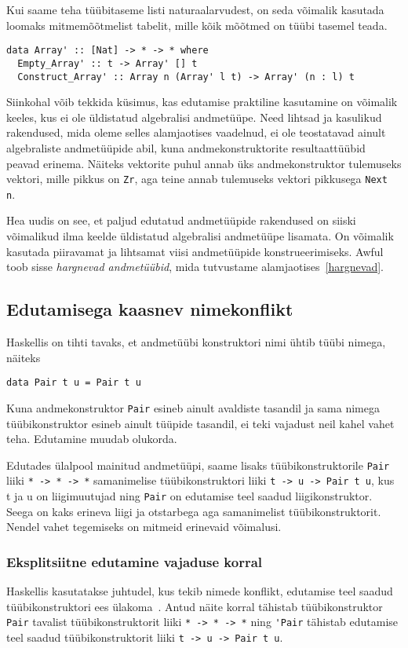 \documentclass[12pt]{article}
\begin{document}
      Kui saame teha tüübitaseme listi naturaalarvudest, on seda võimalik kasutada loomaks mitmemõõtmelist tabelit, mille kõik mõõtmed on tüübi tasemel teada.

      \begin{verbatim}data Array' :: [Nat] -> * -> * where
  Empty_Array' :: t -> Array' [] t
  Construct_Array' :: Array n (Array' l t) -> Array' (n : l) t\end{verbatim}

      Siinkohal võib tekkida küsimus, kas edutamise praktiline kasutamine on võimalik keeles, kus ei ole üldistatud algebralisi andmetüüpe. Need lihtsad ja kasulikud rakendused, mida oleme selles alamjaotises vaadelnud, ei ole teostatavad ainult algebraliste andmetüüpide abil, kuna andmekonstruktorite resultaattüübid peavad erinema. Näiteks vektorite puhul annab üks andmekonstruktor tulemuseks vektori, mille pikkus on \verb!Zr!, aga teine annab tulemuseks vektori pikkusega \verb!Next n!.

      Hea uudis on see, et paljud edutatud andmetüüpide rakendused on siiski võimalikud ilma keelde üldistatud algebralisi andmetüüpe lisamata. On võimalik kasutada piiravamat ja lihtsamat viisi andmetüüpide konstrueerimiseks. Awful toob sisse \textit{hargnevad andmetüübid}, mida tutvustame alamjaotises~\ref{hargnevad}.
    \subsection{Edutamisega kaasnev nimekonflikt}
      Haskellis on tihti tavaks, et andmetüübi konstruktori nimi ühtib tüübi nimega, näiteks

      \begin{verbatim}data Pair t u = Pair t u\end{verbatim}

      Kuna andmekonstruktor \verb!Pair! esineb ainult avaldiste tasandil ja sama nimega tüübikonstruktor esineb ainult tüüpide tasandil, ei teki vajadust neil kahel vahet teha. Edutamine muudab olukorda.

      Edutades ülalpool mainitud andmetüüpi, saame lisaks tüübikonstruktorile \verb!Pair! liiki \verb!* -> * -> *! samanimelise tüübikonstruktori liiki \verb!t -> u -> Pair t u!, kus t ja u on liigimuutujad ning \verb!Pair! on edutamise teel saadud liigikonstruktor. Seega on kaks erineva liigi ja otstarbega aga samanimelist tüübikonstruktorit. Nendel vahet tegemiseks on mitmeid erinevaid võimalusi.
      \subsubsection{Eksplitsiitne edutamine vajaduse korral}
        Haskellis kasutatakse juhtudel, kus tekib nimede konflikt, edutamise teel saadud tüübikonstruktori ees ülakoma~\cite{Giv}. Antud näite korral tähistab tüübikonstruktor \verb!Pair! tavalist tüübikonstruktorit liiki \verb!* -> * -> *! ning \verb!'Pair! tähistab edutamise teel saadud tüübikonstruktorit liiki \verb!t -> u -> Pair t u!.
\end{document}
